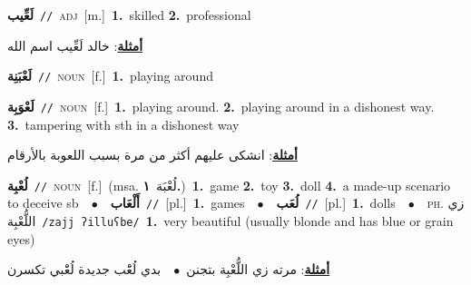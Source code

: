 \documentclass[10pt,a4paper,twoside]{article} %
\begin{document}
\begin{multicols}{2}
{\setlength\topsep{0pt}\textbf{\foreignlanguage{arabic}{لَعِّيب}}\ {\color{gray}\texttt{//}\color{black}}\ \textsc{adj}\ [m.]\ \textbf{1.}~skilled  \textbf{2.}~professional\  \begin{flushright}\color{gray}\foreignlanguage{arabic}{\textbf{\underline{\foreignlanguage{arabic}{أمثلة}}}: خالد لَعِّيب اسم الله}\end{flushright}\color{black}} \vspace{2mm}

{\setlength\topsep{0pt}\textbf{\foreignlanguage{arabic}{لَعْبَنِة}}\ {\color{gray}\texttt{//}\color{black}}\ \textsc{noun}\ [f.]\ \textbf{1.}~playing around\ } \vspace{2mm}

{\setlength\topsep{0pt}\textbf{\foreignlanguage{arabic}{لَعْوَبِة}}\ {\color{gray}\texttt{//}\color{black}}\ \textsc{noun}\ [f.]\ \textbf{1.}~playing around.  \textbf{2.}~playing around in a dishonest way.  \textbf{3.}~tampering with sth in a dishonest way\  \begin{flushright}\color{gray}\foreignlanguage{arabic}{\textbf{\underline{\foreignlanguage{arabic}{أمثلة}}}: انشكى عليهم أكثر من مرة بسبب اللعوبة بالأرقام}\end{flushright}\color{black}} \vspace{2mm}

{\setlength\topsep{0pt}\textbf{\foreignlanguage{arabic}{لُعْبِة}}\ {\color{gray}\texttt{//}\color{black}}\ \textsc{noun}\ [f.]\ \color{gray}(msa. \foreignlanguage{arabic}{لُعْبَة}~\foreignlanguage{arabic}{\textbf{١.}})\color{black}\ \textbf{1.}~game  \textbf{2.}~toy  \textbf{3.}~doll  \textbf{4.}~a made-up scenario to deceive sb\ \ $\bullet$\ \ \setlength\topsep{0pt}\textbf{\foreignlanguage{arabic}{أَلْعَاب}}\ {\color{gray}\texttt{//}\color{black}}\ [pl.]\ \textbf{1.}~games\ \ $\bullet$\ \ \setlength\topsep{0pt}\textbf{\foreignlanguage{arabic}{لُعَب}}\ {\color{gray}\texttt{//}\color{black}}\ [pl.]\ \textbf{1.}~dolls\ \ $\bullet$\ \ \textsc{ph.} \color{gray} \foreignlanguage{arabic}{زي اللُّعْبِة}\color{black}\ {\color{gray}\texttt{/{\sffamily zajj ʔilluʕbe}/}\color{black}}\ \textbf{1.}~very beautiful (usually blonde and has blue or grain eyes)\  \begin{flushright}\color{gray}\foreignlanguage{arabic}{\textbf{\underline{\foreignlanguage{arabic}{أمثلة}}}: مرته زي اللُّعْبِة بتجنن\ $\bullet$\ \  بدي لُعَْب جديدة لُعَْبي تكسرن}\end{flushright}\color{black}} \vspace{2mm}


\end{multicols}
\end{document}
